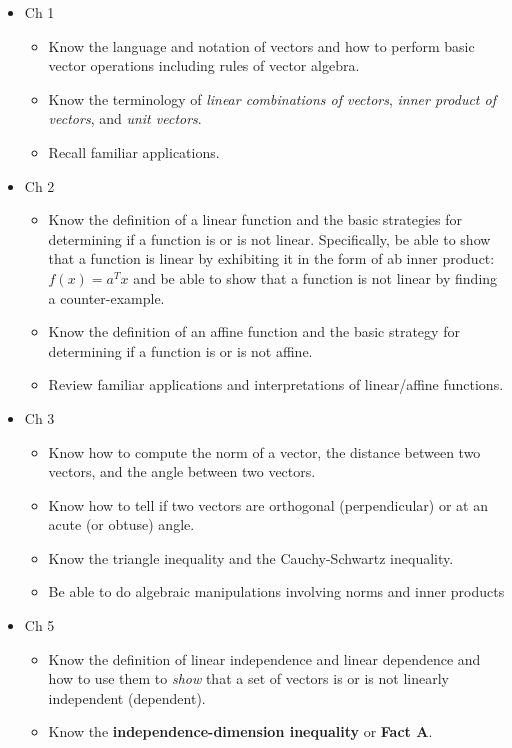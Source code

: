 \documentclass[11pt,fleqn]{article}
\begin{document}
\begin{itemize}
	\item Ch 1 
		\begin{itemize} 
		\item Know the language and notation of vectors and how to perform basic vector operations including rules of vector algebra.
		\item Know the terminology of \emph{linear combinations of vectors}, \emph{inner product of vectors}, and \emph{unit vectors}.
		\item Recall familiar applications.
		\end{itemize}
	\item Ch 2 
		\begin{itemize}
		\item Know the definition of a linear function and the basic strategies for determining if a function is or is not linear. Specifically, be able to show that a function is linear by exhibiting it in the form of
ab inner product: $f(x) = a^T x$ and be able to show that a function is not linear by finding a counter-example.
		\item Know the definition of an affine function and the basic strategy for determining if a function is or is not affine.
		\item Review familiar applications and interpretations of linear/affine functions.
		\end{itemize}
	\item Ch 3
		\begin{itemize}
		\item Know how to compute the norm of a vector, the distance between two vectors, and the angle between two vectors.
		\item Know how to tell if two vectors are orthogonal (perpendicular) or at an acute (or obtuse) angle.
		\item Know the triangle inequality and the Cauchy-Schwartz inequality.
		\item Be able to do algebraic manipulations involving norms and inner products
		\end{itemize}
	\item Ch 5
		\begin{itemize}
		\item Know the definition of linear independence and linear dependence and how to use them to \emph{show} that a set of vectors is or is not linearly independent (dependent).
		\item Know the \textbf{independence-dimension inequality} or \textbf{Fact A}.

\end{itemize}
\end{itemize}
\end{document}
